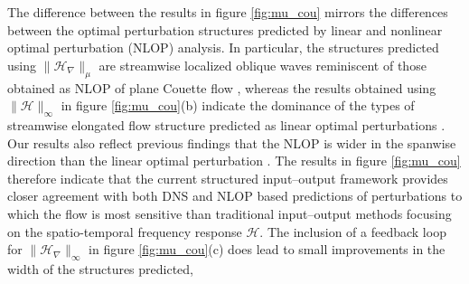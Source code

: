 The difference between the results in figure \ref{fig:mu_cou} mirrors the differences between the optimal perturbation structures predicted by linear and nonlinear optimal perturbation (NLOP) analysis. In particular, the structures predicted using $\|\mathcal{H}_\nabla\|_\mu$ are streamwise localized oblique waves reminiscent of those obtained as NLOP of plane Couette flow \citep{Monokrousos2011,duguet2010towards,Duguet2013,rabin2012triggering,cherubini2013nonlinear,cherubini2015minimal}, whereas the results obtained using $\|\mathcal{H}\|_\infty$ in figure \ref{fig:mu_cou}(b) indicate the dominance of the types of streamwise elongated flow structure predicted as linear optimal perturbations \citep{butler1992three}. Our results also reflect previous findings that the NLOP is wider in the spanwise direction than the linear optimal perturbation . The results in figure 
\ref{fig:mu_cou} therefore indicate that the current structured input--output framework provides closer agreement with both DNS and NLOP based predictions of perturbations to which the flow is most sensitive than traditional input--output methods focusing on the spatio-temporal frequency response $\mathcal{H}$. The inclusion of a feedback loop for $\|\mathcal{H}_{\nabla}\|_{\infty}$ in figure \ref{fig:mu_cou}(c) does lead to small improvements in the width of the structures predicted,  


